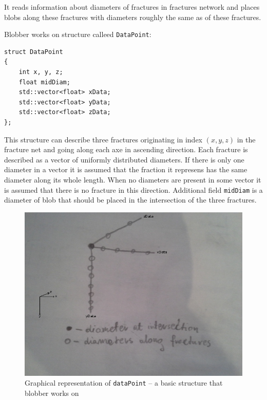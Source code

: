It reads information about diameters of fractures in fractures network
and places blobs along these fractures with diameters roughly the same as of
these fractures.

Blobber works on structure calleed \texttt{DataPoint}:

\begin{lstlisting}
struct DataPoint
{
  	int x, y, z;
	float midDiam;
	std::vector<float> xData;
	std::vector<float> yData;
	std::vector<float> zData;
};
\end{lstlisting}

This structure can describe three fractures originating in index $(x,y,z)$ in
the fracture net and going along each axe in ascending direction. Each fracture
is described as a vector of uniformly distributed diameters. If there is only
one diameter in a vector it is assumed that the fraction it represens has the
same diameter along its whole length. When no diameters are present in some
vector it is assumed that there is no fracture in this direction.
Additional field \texttt{midDiam} is a diameter of blob that should be placed in
the intersection of the three fractures.

\begin{figure}[hbp]
  \begin{center}
    \includegraphics[width=\textwidth]{chapters/project/datapoint.jpg}
  \end{center}
  \caption{Graphical representation of \texttt{dataPoint} -- a basic structure that
blobber works on}
  \label{fig:datapoint}
\end{figure}


